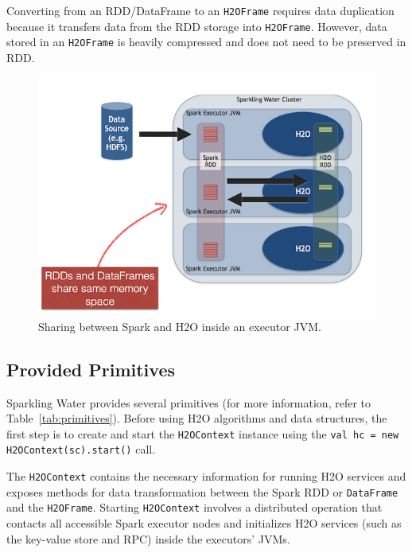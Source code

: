 \documentclass{standalone}
\begin{document}
Converting from an RDD/DataFrame to an \texttt{H2OFrame} requires data duplication because it transfers data from the RDD storage into \texttt{H2OFrame}. However, data stored in an \texttt{H2OFrame} is heavily compressed and does not need to be preserved in RDD.

\begin{figure}[h!]
	\centering
	\includegraphics[scale=1]{sw/images/DataShare.png}
	\caption{Sharing between Spark and H2O inside an executor JVM.}
\end{figure}


\subsection{Provided Primitives}

Sparkling Water provides several primitives (for more information, refer to Table~\ref{tab:primitives}). Before using H2O algorithms and data structures, the first step is to create and start the \texttt{H2OContext} instance using the \texttt{val hc = new H2OContext(sc).start()} call. 

The \texttt{H2OContext} contains the necessary information for running H2O services and exposes methods for data transformation between the Spark RDD or \texttt{DataFrame} and the \texttt{H2OFrame}. Starting \texttt{H2OContext} involves a distributed operation that contacts all accessible Spark executor nodes and initializes H2O services (such as the key-value store and RPC) inside the executors' JVMs.
\end{document}
